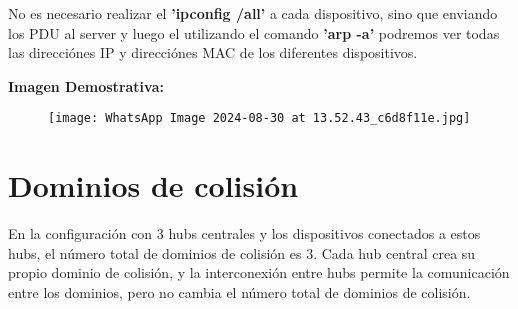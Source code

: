 \documentclass{article}
\begin{document}
	No es necesario realizar el \textbf{'ipconfig /all'} a cada dispositivo, sino que enviando los PDU al server y luego el utilizando el comando \textbf{'arp -a'} podremos ver todas las direcciónes IP y direcciónes MAC de los diferentes dispositivos.

 \textbf{Imagen Demostrativa:}
	\begin{figure}
	    \centering
	    \texttt{[image: WhatsApp Image 2024-08-30 at 13.52.43\_c6d8f11e.jpg]}
	\end{figure}
	
	\section{Dominios de colisión}
	
		En la configuración con 3 hubs centrales y los dispositivos conectados a estos hubs, el número total de dominios de colisión es 3. Cada hub central crea su propio dominio de colisión, y la interconexión entre hubs permite la comunicación entre los dominios, pero no cambia el número total de dominios de colisión.
			
\end{document}
